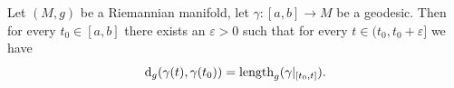 
\lecture{}

\begin{theorem}
Let $(M,g)$ be a Riemannian manifold, let $\gamma\colon[a,b]\to M$ be
a geodesic. Then for every $t_{0}\in[a,b]$ there exists an
$\varepsilon>0$ such that for every $t\in(t_{0},t_{0}+\varepsilon]$ we have
\begin{equation}
\mathrm{d}_{g}(\gamma(t),\gamma(t_{0}))=\operatorname{length}_{g}(\gamma|_{[t_{0},t]}).
\end{equation}
\end{theorem}